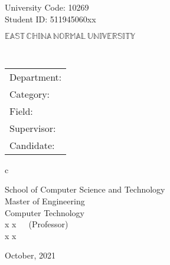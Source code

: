 \newpage

\pagestyle{empty}

\newline
\hspace*{\fill} {University Code: 10269}\\
\hspace*{\fill} {Student ID: 
511945060xx
}%

\vskip 2cm

\begin{center}
    {\Huge $\mathbb{EAST}\,\mathbb{CHINA}\,\mathbb{NORMAL}\,
            \mathbb{UNIVERSITY}$}
\end{center}

\vskip 3cm

\begin{center}
    \bfseries{\scshape{\huge \thesisETitle}}\\
\end{center}

\vskip 2cm {\large
        \begin{center}
            \begin{tabular}{l}
                Department:         \\
                Category:              \\
                Field: \\
                Supervisor:         \\
                Candidate:
            \end{tabular}
            \begin{tabular}c

                School of Computer Science and Technology\\
                \hline Master of Engineering\\
                \hline Computer Technology\\
                \hline x x~~~(Professor)\\
                \hline x x\\


                \hline
            \end{tabular}
        \end{center}}

\vskip 30mm

\begin{center}
    {\Large October, 2021}
\end{center}
